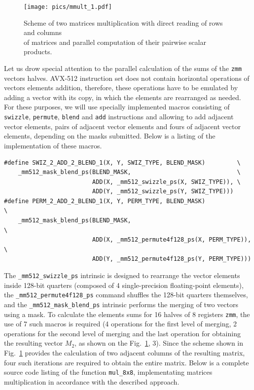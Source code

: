 \documentclass[
11pt,%
tightenlines,%
twoside,%
onecolumn,%
nofloats,%
nobibnotes,%
nofootinbib,%
superscriptaddress,%
noshowpacs,%
centertags]%
{revtex4}
\begin{document}
\begin{figure}[h]
\setcaptionmargin{5mm}
\onelinecaptionsfalse %
\texttt{[image: pics/mmult\_1.pdf]}
\caption{Scheme of two matrices multiplication with direct reading of rows and columns \\ of matrices and parallel computation of their pairwise scalar products.}\label{fig:mmult_1}
\end{figure}

Let us drow special attention to the parallel calculation of the sums of the \texttt{zmm} vectors halves.
AVX-512 instruction set does not contain horizontal operations of vectors elements addition, therefore, these operations have to be emulated by adding a vector with its copy, in which the elements are rearranged as needed.
For these purposes, we will use specially implemented macros consisting of \texttt{swizzle}, \texttt{permute}, \texttt{blend} and \texttt{add} instructions and allowing to add adjacent vector elements, pairs of adjacent vector elements and fours of adjacent vector elements, depending on the masks submitted.
Below is a listing of the implementation of these macros.

\begin{lstlisting}
#define SWIZ_2_ADD_2_BLEND_1(X, Y, SWIZ_TYPE, BLEND_MASK)         \
    _mm512_mask_blend_ps(BLEND_MASK,                              \
                         ADD(X, _mm512_swizzle_ps(X, SWIZ_TYPE)), \
                         ADD(Y, _mm512_swizzle_ps(Y, SWIZ_TYPE)))
#define PERM_2_ADD_2_BLEND_1(X, Y, PERM_TYPE, BLEND_MASK)              \
    _mm512_mask_blend_ps(BLEND_MASK,                                   \
                         ADD(X, _mm512_permute4f128_ps(X, PERM_TYPE)), \
                         ADD(Y, _mm512_permute4f128_ps(Y, PERM_TYPE)))
\end{lstlisting}

The \texttt{\_mm512\_swizzle\_ps} intrinsic is designed to rearrange the vector elements inside 128-bit quarters (composed of 4 single-precision floating-point elements), the \texttt{\_mm512\_permute4f128\_ps} command shuffles the 128-bit quarters themselves, and the \texttt{\_mm512\_mask\_blend\_ps} intrinsic performs the merging of two vectors using a mask.
To calculate the elements sums for 16 halves of 8 registers \texttt{zmm}, the use of 7 such macros is required (4 operations for the first level of merging, 2 operations for the second level of merging and the last operation for obtaining the resulting vector $M_2$, as shown on the Fig.~\ref{fig:mmult_1}, 3).
Since the scheme shown in Fig.~\ref{fig:mmult_1} provides the calculation of two adjacent columns of the resulting matrix, four such iterations are required to obtain the entire matrix.
Below is a complete source code listing of the function \texttt{mul\_8x8}, implementating matrices multiplication in accordance with the described approach.
\end{document}
